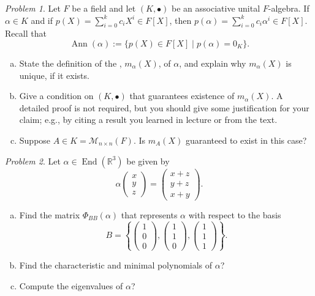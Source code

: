 \documentclass[11pt]{paper}
\theoremstyle{remark}
\newtheorem{problem}{Problem}
\newcommand{\<}{\ensuremath{\langle}}
\renewcommand{\>}{\ensuremath{\rangle}}
\newcommand\fld[1]{\ensuremath{\mathbb{#1}}}
\newcommand\R{\ensuremath{\fld{R}}}
\newcommand\Ann{\ensuremath{\operatorname{Ann}}}
\newcommand\End{\ensuremath{\operatorname{End}}}
\begin{document}
\probskip
\begin{problem}
Let $F$ be  a field and let $(K, \bullet)$ be an associative unital
$F$-algebra.  If $\alpha \in K$ and if $p(X) = \sum_{i=0}^k c_i X^i \in  F[X]$,
then $p(\alpha) = \sum_{i=0}^k c_i \alpha^i \in  F[X]$.  Recall that 
\[
\Ann(\alpha) := \{p(X) \in F[X] \mid p(\alpha) = 0_K\}.
\]
\begin{enumerate}[(a)]
\item State the definition of the , $m_\alpha(X)$, of
  $\alpha$, and explain why $m_\alpha(X)$ is unique, if it exists.
\item Give a condition on $(K, \bullet)$ that guarantees existence of 
 $m_\alpha(X)$. A detailed proof is not required, but you should give some
  justification for your claim; e.g., by citing a result you learned in
  lecture or from the text. 
\item Suppose $A \in K = \mathcal{M}_{n\times n}(F)$. Is $m_A(X)$ guaranteed to
  exist in this case?
\end{enumerate}
\end{problem}

\probskip
\begin{problem}
Let $\alpha\in \End(\R^3)$ be given by 
\[
\alpha 
\begin{pmatrix}
x \\  y \\ z
\end{pmatrix}
  = 
\begin{pmatrix}
x +z \\  y+z \\ x+y
\end{pmatrix}.
\]
\begin{enumerate}[(a)]
\item  Find the matrix $\Phi_{BB}(\alpha)$ that represents $\alpha$ with
  respect to the basis  
\[
B = \left\{ 
\begin{pmatrix}1 \\  0 \\ 0\end{pmatrix},
\begin{pmatrix}1 \\  1 \\ 0\end{pmatrix},
\begin{pmatrix}1 \\  1 \\ 1\end{pmatrix}\right\}.
\]
\item Find the characteristic and minimal polynomials of $\alpha$? 
\item Compute the eigenvalues of $\alpha$?
\end{enumerate}
\end{problem}
\end{document}
